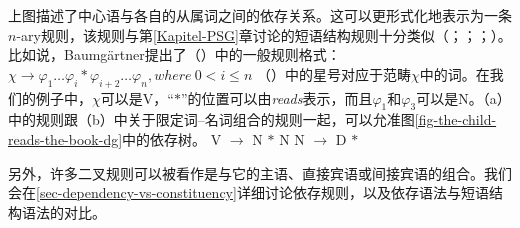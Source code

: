 上图描述了中心语与各自的从属词之间的依存关系。这可以更形式化地表示为一条$n$-ary规则\label{page-rule-format-dg}，该规则与第\ref{Kapitel-PSG}章讨论的短语结构规则十分类似（\citealp[]{Gaifman65a}；\citealp[]{Hays64a-u}；\citealp[]{Baumgaertner70a}；\citealp[\S~4.1]{Heringer96a-u}）。比如说，Baumgärtner提出了（）中的一般规则格式：
\ea
$\chi \to \varphi_1 \ldots \varphi_i * \varphi_{i+2} \ldots \varphi_n, where~0 < i \leq n$
\z
（）中的星号对应于范畴$\chi$中的词。在我们的例子中，$\chi$可以是V，“$*$”的位置可以由\emph{reads}表示，而且$\varphi_1$和$\varphi_3$可以是N。（a）中的规则跟（b）中关于限定词--名词组合的规则一起，可以允准图\ref{fig-the-child-reads-the-book-dg}中的依存树。
\eal
\ex V $\to$ N $*$ N
\ex N $\to$ D $*$
\zl

\noindent
另外，许多二叉规则可以被看作是与它的主语、直接宾语或间接宾语的组合\citep{Kahane2009a}。我们会在\ref{sec-dependency-vs-constituency}详细讨论依存规则，以及依存语法与短语结构语法的对比。


